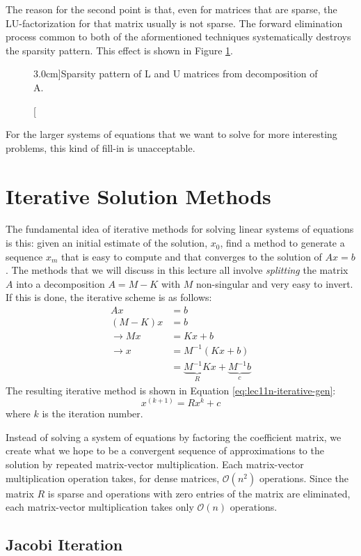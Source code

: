 The reason for the second point is that, even for matrices that are sparse, the LU-factorization for that matrix usually is not sparse.  The forward elimination process common to both of the aformentioned techniques systematically destroys the sparsity pattern.  This effect is shown in Figure \ref{fig:lec11n-LandU}.
\begin{figure}[h!]
\label{fig:lec11n-LandU}
\caption[][3.0cm]{Sparsity pattern of L and U matrices from decomposition of A.}
\end{figure}

\noindent For the larger systems of equations that we want to solve for more interesting problems, this kind of fill-in is unacceptable.

\section{Iterative Solution Methods}

The fundamental idea of iterative methods for solving linear systems of equations is this: given an initial estimate of the solution, $x_0$, find a method to generate a sequence $x_m$ that is easy to compute and that converges to the solution of $Ax=b$.  The methods that we will discuss in this lecture all involve \emph{splitting} the matrix $A$ into a decomposition $A=M-K$ with $M$ non-singular and very easy to invert.  If this is done, the iterative scheme is as follows:
\begin{align*}
Ax &= b \\
(M-K)x &= b \\
\rightarrow Mx &= Kx + b \\
\rightarrow x &= M^{-1}(Kx + b) \\
&= \underbrace{M^{-1}K}_{R}x + \underbrace{M^{-1}b}_{c}
\end{align*}
The resulting iterative method is shown in Equation \ref{eq:lec11n-iterative-gen}:
\begin{equation}
x^{(k+1)} = Rx^{k} + c
\label{eq:lec11n-iterative-gen}
\end{equation}
where $k$ is the iteration number.

Instead of solving a system of equations by factoring the coefficient matrix, we create what we hope to be a convergent sequence of approximations to the solution by repeated matrix-vector multiplication.  Each matrix-vector multiplication operation takes, for dense matrices, $\mathcal{O}(n^2)$ operations.  Since the matrix $R$ is sparse and operations with zero entries of the matrix are eliminated, each matrix-vector multiplication takes only $\mathcal{O}(n)$ operations.

\subsection{Jacobi Iteration}


